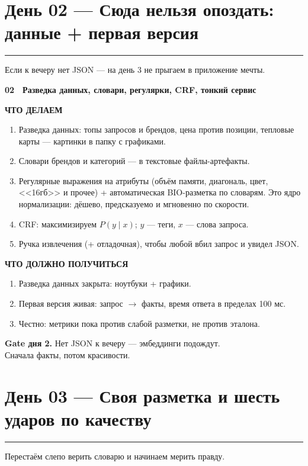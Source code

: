 \documentclass[11pt,a4paper]{article}
\newcommand{\secrule}{%
  \par\vspace{4pt}%
  {\color{mvred}\noindent\rule{\linewidth}{0.9pt}\par}%
  \vspace{8pt}%
}
\newcommand{\daysection}[1]{%
  \Needspace{22\baselineskip}%
  \section{#1}\secrule
}
\newcommand{\dayblock}[4]{%
  \begin{tcolorbox}[
    enhanced,
    colback=white,
    colframe=rulec,
    boxrule=0.65pt,
    arc=2pt,
    left=8pt,
    right=8pt,
    top=8pt,
    bottom=8pt,
    before skip=3pt,
    after skip=11pt,
  ]
  {\color{mvred}\bfseries #1}~~{\bfseries #2}\par\vspace{4pt}%
  {\scriptsize\bfseries\color{inksoft}ЧТО ДЕЛАЕМ}\par\vspace{1pt}%
  #3\par\vspace{5pt}%
  {\scriptsize\bfseries\color{mint}ЧТО ДОЛЖНО ПОЛУЧИТЬСЯ}\par\vspace{1pt}%
  #4%
  \end{tcolorbox}%
}
\begin{document}
\daysection{День 02 --- Сюда нельзя опоздать: данные + первая версия}
Если к вечеру нет JSON --- на день 3 не прыгаем в приложение мечты.

\dayblock{02}{Разведка данных, словари, регулярки, CRF, тонкий сервис}{%
\begin{enumerate}
  \item Разведка данных: топы запросов и брендов, цена против позиции, тепловые карты --- картинки в папку с графиками.
  \item Словари брендов и категорий --- в текстовые файлы-артефакты.
  \item Регулярные выражения на атрибуты (объём памяти, диагональ, цвет, <<16гб>> и прочее) + автоматическая BIO-разметка по словарям. Это ядро нормализации: дёшево, предсказуемо и мгновенно по скорости.
  \item CRF: максимизируем $P(y\mid x)$; $y$ --- теги, $x$ --- слова запроса.
  \item Ручка извлечения (+ отладочная), чтобы любой вбил запрос и увидел JSON.
\end{enumerate}
}{%
\begin{enumerate}
  \item Разведка данных закрыта: ноутбуки + графики.
  \item Первая версия живая: запрос $\to$ факты, время ответа в пределах 100 мс.
  \item Честно: метрики пока против слабой разметки, не против эталона.
\end{enumerate}
}

\begin{center}
\begin{tcolorbox}[colback=sand!45, colframe=mvred, boxrule=0.75pt, width=0.92\textwidth, arc=2pt, before skip=2pt, after skip=10pt]
\centering\textbf{Gate дня 2.} Нет JSON к вечеру --- эмбеддинги подождут.\\[2pt]
Сначала факты, потом красивости.
\end{tcolorbox}
\end{center}

\daysection{День 03 --- Своя разметка и шесть ударов по качеству}
Перестаём слепо верить словарю и начинаем мерить правду.
\end{document}
